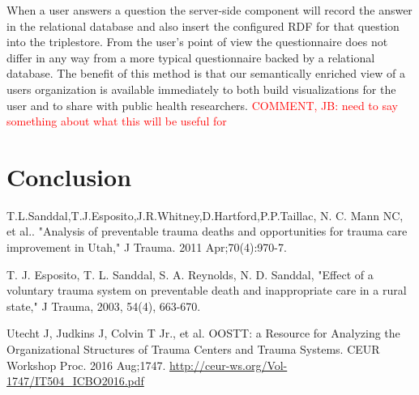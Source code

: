 \documentclass{amia}
\begin{document}
When a user answers a question the server-side component will record the answer in the relational database and also insert the configured RDF for that question into the triplestore.
From the user's point of view the questionnaire does not differ in any way from a more typical questionnaire backed by a relational database.
The benefit of this method is that our semantically enriched view of a users organization is available immediately to both build visualizations for the user and to share with public health researchers.
\textcolor{red}{COMMENT, JB: need to say something about what this will be useful for}

\section*{Conclusion}


\makeatletter
\renewcommand{\@biblabel}[1]{\hfill #1.}
\makeatother


\begin{thebibliography}{1}
\setlength\itemsep{-0.1em}

T.L.Sanddal,T.J.Esposito,J.R.Whitney,D.Hartford,P.P.Taillac, N. C. Mann NC, et al.. "Analysis of preventable trauma deaths and opportunities for trauma care improvement in Utah," J Trauma. 2011 Apr;70(4):970-7.

T. J. Esposito, T. L. Sanddal, S. A. Reynolds, N. D. Sanddal, "Effect of a voluntary trauma system on preventable death and inappropriate care in a rural state," J Trauma, 2003, 54(4), 663-670.

Utecht J, Judkins J, Colvin T Jr., et al. OOSTT: a Resource for Analyzing the Organizational Structures of Trauma Centers and Trauma Systems. CEUR Workshop Proc. 2016 Aug;1747. \url{http://ceur-ws.org/Vol-1747/IT504_ICBO2016.pdf}



\end{thebibliography}
\end{document}
